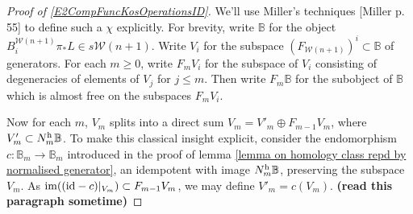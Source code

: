 \documentclass[11pt]{amsart}
\theoremstyle{plain}
\theoremstyle{definition}
\DeclareMathOperator{\im}{im}
\renewcommand{\to}{\longrightarrow}
\newcommand{\calW}{\mathcal{W}}
\theoremstyle{plain}
\begin{document}
\begin{Composite functor spectral sequences}
\begin{tricky proofs of operation compatibilities}
\begin{proof}[Proof of \ref{E2CompFuncKosOperationsID}]
We'll use Miller's techniques [Miller p. 55] to define such a $\chi$ explicitly. For brevity, write $\mathbb{B}$ for the object $B_i^{\calW(n+1)}\pi_*L\in s\calW(n+1)$. Write $V_i$ for the subspace $(F_{\calW(n+1)})^{i}\subset \mathbb{B}$ of generators. For each $m\geq0$, write $F_mV_i$ for the subspace of $V_i$ consisting of degeneracies of elements of $V_j$ for $j\leq m$. Then write $F_m\mathbb{B}$ for the subobject of $\mathbb{B}$ which is almost free on the subspaces $F_mV_i$.

Now for each $m$, $V_m$ splits into a direct sum
$V_m=V'_m\oplus F_{m-1}V_m$,
where $V'_m\subset N_m^\textup{h}\mathbb{B}$. To make this classical insight explicit, consider the endomorphism $c:\mathbb{B}_m\to \mathbb{B}_m$ introduced in the proof of lemma \ref{lemma on homology class repd by normalised generator}, an idempotent with image $N_m^\textup{h}\mathbb{B}$, preserving the subspace $V_m$. As $\im((\textup{id}-c)|_{V_m})\subset F_{m-1}V_m$, we may define $V'_m=c(V_m)$. \textbf{(read this paragraph sometime)}


\end{proof}
\end{tricky proofs of operation compatibilities}
\end{Composite functor spectral sequences}
\end{document}
